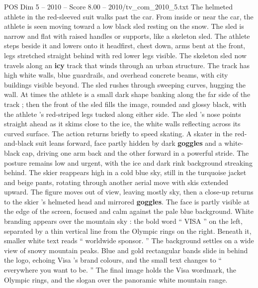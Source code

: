 \begin{textsample}{POS Dim 5 – 2010 – Score 8.00 – 2010/tv\_com\_2010\_5.txt}
The helmeted athlete in the red-sleeved suit walks past the car.
From inside or near the car, the athlete is seen moving toward a low black sled resting on the snow.
The sled is narrow and flat with raised handles or supports, like a skeleton sled.
The athlete steps beside it and lowers onto it headfirst, chest down, arms bent at the front, legs stretched straight behind with red lower legs visible.
The skeleton sled now travels along an \textbf{icy} track that winds through an urban structure.
The track has high white walls, blue guardrails, and overhead concrete beams, with city buildings visible beyond.
The sled rushes through sweeping curves, hugging the wall.
At times the athlete is a small dark shape banking along the far side of the track ; then the front of the sled fills the image, rounded and glossy black, with the athlete ’s red-striped legs tucked along either side.
The sled ’s nose points straight ahead as it skims close to the ice, the white walls reflecting across its curved surface.
The action returns briefly to speed skating.
A skater in the red-and-black suit leans forward, face partly hidden by dark \textbf{goggles} and a white-black cap, driving one arm back and the other forward in a powerful stride.
The posture remains low and urgent, with the ice and dark rink background streaking behind.
The skier reappears high in a cold blue sky, still in the turquoise jacket and beige pants, rotating through another aerial move with skis extended upward.
The figure moves out of view, leaving mostly sky, then a close-up returns to the skier ’s helmeted head and mirrored \textbf{goggles}.
The face is partly visible at the edge of the screen, focused and calm against the pale blue background.
White branding appears over the mountain sky : the bold word “ VISA ” on the left, separated by a thin vertical line from the Olympic rings on the right.
Beneath it, smaller white text reads “ worldwide sponsor. ” The background settles on a wide view of snowy mountain peaks.
Blue and gold rectangular bands slide in behind the logo, echoing Visa ’s brand colours, and the small text changes to “ everywhere you want to be. ” The final image holds the Visa wordmark, the Olympic rings, and the slogan over the panoramic white mountain range.

\end{textsample}
